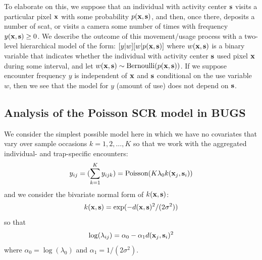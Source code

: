 To elaborate on this, we suppose that an individual with activity
center ${\bf s}$ visits a
particular pixel ${\bf x}$
with some probability $p({\bf x}, {\bf
  s})$, and then, once there, deposits a number of scat, or visits
a camera some number of times with frequency $y({\bf x},{\bf s}) \ge
0$.  We describe the outcome of this movement/usage process with a two-level
hierarchical model of the form: $[y|w][w|p({\bf x},{\bf s})]$ where
$w({\bf x},{\bf s})$ is a binary variable that indicates whether the
individual with activity center ${\bf s}$ used pixel ${\bf x}$
during some interval, and let $w({\bf x},{\bf s}) \sim
\mbox{Bernoulli}(p({\bf x},{\bf s}))$. If we suppose  encounter frequency
$y$ is independent of ${\bf x}$ and ${\bf s}$ conditional on the
use variable  $w$, then  we see that
the model for $y$ (amount of use) does not depend on ${\bf s}$.

\subsection{Analysis of the Poisson SCR model in BUGS}

We consider the simplest possible model here in which we have no
covariates that vary over sample occasions  $k=1,2,\ldots,K$
so that we work with
the aggregated individual- and trap-specific encounters:
\[
y_{ij} = (\sum_{k=1}^{K} y_{ijk}) =  \mbox{Poisson}(K  \lambda_{0}
k({\bf x}_{j},{\bf s}_{i}) )
\]
and we consider the bivariate normal form of $k({\bf x},{\bf s})$:
\[
k({\bf x},{\bf s}) = \exp( -d({\bf x}, {\bf
  s})^{2} /(2\sigma^{2}))
\]
so that
\[
\log( \lambda_{ij})  =\alpha_{0} - \alpha_{1} d({\bf x}_{j}, {\bf s}_{i})^2
\]
where $\alpha_{0} = \log(\lambda_{0})$ and $\alpha_1 = 1/(2\sigma^2)$.


